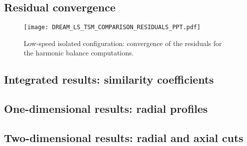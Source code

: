 \subsection{Residual convergence} 
\label{sub:dream_ls_hb_convergence_res}

\begin{figure}[htp]
  \centering
  \texttt{[image: DREAM\_LS\_TSM\_COMPARISON\_RESIDUALS\_PPT.pdf]}
  \caption{Low-speed isolated configuration: convergence of the residuals
  for the harmonic balance computations.}
  \label{fig:DREAM_LS_TSM_COMPARISON_RESIDUALS_PPT}
\end{figure}

\subsection{Integrated results: similarity coefficients}
\label{sub:dream_ls_hb_sim_coeff}

\subsection{One-dimensional results: radial profiles}
\label{sub:dream_ls_hb_radial_profiles}

\subsection{Two-dimensional results: radial and axial cuts}
\label{sub:dream_ls_hb_axial_radial_cuts}
